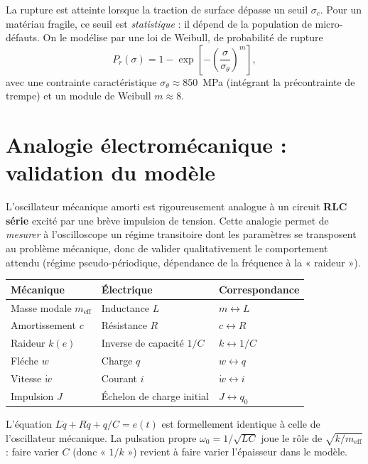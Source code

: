 \documentclass[11pt,a4paper]{article}
\begin{document}
La rupture est atteinte lorsque la traction de surface dépasse un seuil
$\sigma_c$. Pour un matériau fragile, ce seuil est \emph{statistique} : il
dépend de la population de micro-défauts. On le modélise par une loi de
Weibull, de probabilité de rupture
\begin{equation}
P_r(\sigma) = 1 - \exp\!\left[-\left(\frac{\sigma}{\sigma_\theta}\right)^{m}\right],
\label{eq:weibull}
\end{equation}
avec une contrainte caractéristique $\sigma_\theta \approx 850$~MPa
(intégrant la précontrainte de trempe) et un module de Weibull $m\approx 8$.


\section{Analogie électromécanique : validation du modèle}

L'oscillateur mécanique amorti est rigoureusement analogue à un circuit
\textbf{RLC série} excité par une brève impulsion de tension. Cette analogie
permet de \emph{mesurer} à l'oscilloscope un régime transitoire dont les
paramètres se transposent au problème mécanique, donc de valider qualitativement
le comportement attendu (régime pseudo-périodique, dépendance de la fréquence à
la « raideur »).

\begin{center}\small
\begin{tabular}{lll}
\toprule
Mécanique & Électrique & Correspondance \\
\midrule
Masse modale $m_{\mathrm{eff}}$ & Inductance $L$ & $m \leftrightarrow L$ \\
Amortissement $c$ & Résistance $R$ & $c \leftrightarrow R$ \\
Raideur $k(e)$ & Inverse de capacité $1/C$ & $k \leftrightarrow 1/C$ \\
Fléche $w$ & Charge $q$ & $w \leftrightarrow q$ \\
Vitesse $\dot w$ & Courant $i$ & $\dot w \leftrightarrow i$ \\
Impulsion $J$ & Échelon de charge initial & $J \leftrightarrow q_0$ \\
\bottomrule
\end{tabular}
\end{center}

L'équation $L\ddot q + R\dot q + q/C = e(t)$ est formellement identique à
celle de l'oscillateur mécanique. La pulsation propre
$\omega_0 = 1/\sqrt{LC}$ joue le rôle de $\sqrt{k/m_{\mathrm{eff}}}$ : faire
varier $C$ (donc « $1/k$ ») revient à faire varier l'épaisseur dans le modèle.
\end{document}
